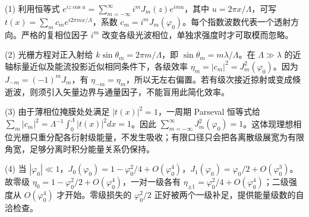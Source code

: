 (1) 利用恒等式 \(e^{iz\cos u}=\sum_{m=-\infty}^\infty i^mJ_m(z)e^{imu}\)，其中 \(u=2\pi x/\Lambda\)，可写 \(t(x)=\sum_m c_me^{i2\pi mx/\Lambda}\)，系数 \(c_m=i^mJ_m(\varphi_0)\)。每个指数波数代表一个透射方向。严格的复相位因子 \(i^m\) 改变各级光波相位，单独求强度时才可取模而忽略。

(2) 光栅方程对正入射给 \(k\sin\theta_m=2\pi m/\Lambda\)，即 \(\sin\theta_m=m\lambda/\Lambda\)。在 \(\Lambda\gg\lambda\) 的近轴标量近似及能流投影近似相同条件下，各级效率 \(\eta_m=|c_m|^2=J_m^2(\varphi_0)\)。因为 \(J_{-m}=(-1)^mJ_m\)，有 \(\eta_{-m}=\eta_m\)，所以无左右偏置。若有级次接近掠射或变成倏逝波，则须引入矢量边界与通量因子，不能盲用此简化效率。

(3) 由于薄相位掩膜处处满足 \(|t(x)|^2=1\)，一周期 Parseval 恒等式给 \(\sum_m|c_m|^2=\Lambda^{-1}\int_0^\Lambda |t(x)|^2dx=1\)。因此 \(\sum_{m=-\infty}^\infty J_m^2(\varphi_0)=1\)。这体现理想相位光栅只重分配各衍射级能量，不发生吸收；有限口径只会把各离散级展宽为有限角宽，足够分离时积分能量关系仍保持。

(4) 当 \(|\varphi_0|\ll1\)，\(J_0(\varphi_0)=1-\varphi_0^2/4+O(\varphi_0^4)\)，\(J_1(\varphi_0)=\varphi_0/2+O(\varphi_0^3)\)。故零级 \(\eta_0=1-\varphi_0^2/2+O(\varphi_0^4)\)，一对一级各有 \(\eta_{\pm1}=\varphi_0^2/4+O(\varphi_0^4)\)；二级强度从 \(O(\varphi_0^4)\) 才开始。零级损失的 \(\varphi_0^2/2\) 正好被两个一级补足，提供能量级数的自洽检查。
